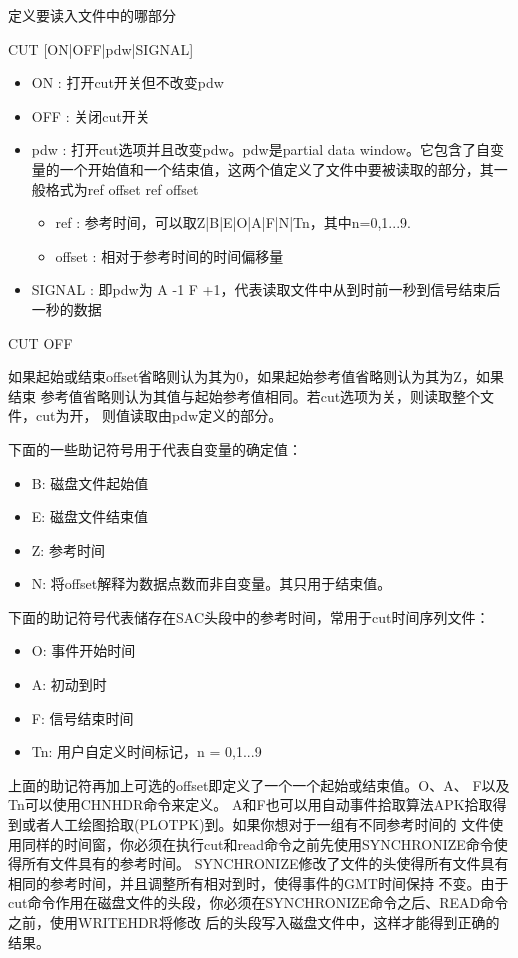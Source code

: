 \label{cmd:cut}

定义要读入文件中的哪部分

CUT [ON|OFF|pdw|SIGNAL]

\begin{itemize}
\item ON : 打开cut开关但不改变pdw 
\item OFF : 关闭cut开关
\item pdw : 打开cut选项并且改变pdw。pdw是partial data window。它包含了自变量的一个开始值和一个结束值，这两个值定义了文件中要被读取的部分，其一般格式为ref offset ref offset
	\begin{itemize}
	\item ref : 参考时间，可以取Z|B|E|O|A|F|N|Tn，其中n=0,1...9. 
	\item offset : 相对于参考时间的时间偏移量
	\end{itemize}
\item SIGNAL : 即pdw为 A -1 F +1，代表读取文件中从到时前一秒到信号结束后一秒的数据 
\end{itemize}

CUT OFF

如果起始或结束offset省略则认为其为0，如果起始参考值省略则认为其为Z，如果结束
参考值省略则认为其值与起始参考值相同。若cut选项为关，则读取整个文件，cut为开，
则值读取由pdw定义的部分。

下面的一些助记符号用于代表自变量的确定值：
\begin{itemize}
\item B: 磁盘文件起始值
\item E: 磁盘文件结束值
\item Z: 参考时间
\item N: 将offset解释为数据点数而非自变量。其只用于结束值。
\end{itemize}
下面的助记符号代表储存在SAC头段中的参考时间，常用于cut时间序列文件：
\begin{itemize}
\item O: 事件开始时间
\item A: 初动到时
\item F: 信号结束时间
\item Tn: 用户自定义时间标记，n = 0,1...9
\end{itemize}

上面的助记符再加上可选的offset即定义了一个一个起始或结束值。O、A、 F以及Tn可以使用CHNHDR命令来定义。
A和F也可以用自动事件拾取算法APK拾取得到或者人工绘图拾取(PLOTPK)到。如果你想对于一组有不同参考时间的
文件使用同样的时间窗，你必须在执行cut和read命令之前先使用SYNCHRONIZE命令使得所有文件具有的参考时间。
SYNCHRONIZE修改了文件的头使得所有文件具有相同的参考时间，并且调整所有相对到时，使得事件的GMT时间保持
不变。由于cut命令作用在磁盘文件的头段，你必须在SYNCHRONIZE命令之后、READ命令之前，使用WRITEHDR将修改
后的头段写入磁盘文件中，这样才能得到正确的结果。

